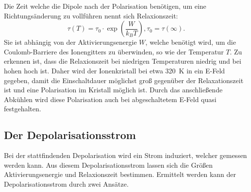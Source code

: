 Die Zeit welche die Dipole nach der Polarisation benötigen,
um eine Richtungsänderung zu vollführen nennt sich Relaxionszeit:
\begin{equation}
    \tau(T) = \tau_0 \cdot \exp\left(\frac{W}{k_B T}\right) , \tau_0 =\tau(\infty).
\end{equation}
Sie ist abhängig von der Aktivierungsenergie $W$,
welche benötigt wird,
um die Coulomb-Barriere des Ionengitters zu überwinden,
so wie der Temperatur $T$.
Zu erkennen ist,
dass die Relaxionszeit bei niedrigen Temperaturen niedrig und bei hohen hoch ist.
Daher wird der Ionenkristall bei etwa \qty{320}{\kelvin} in ein E-Feld gegeben,
damit die Einschaltdauer möglichst groß gegenüber der Relaxationszeit ist und eine Polarisation im Kristall möglich ist.
Durch das anschließende Abkühlen wird diese Polarisation auch bei abgeschaltetem E-Feld quasi festgehalten. 



\subsection{Der Depolarisationsstrom}
Bei der stattfindenden Depolarisation wird ein Strom induziert,
welcher gemessen werden kann. 
Aus diesem Depolarisationsstrom lassen sich die Größen Aktivierungsenergie und Relaxionszeit bestimmen.
Ermittelt werden kann der Depolarisationsstrom durch zwei Ansätze.

